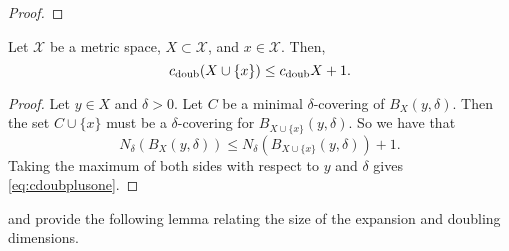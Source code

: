 \documentclass[../main.tex]{subfiles}
\newcommand{\set}[1]{\mathcal {#1}}
\newcommand{\cdoub}{c_\textnormal{doub}}
\begin{document}
\begin{proof}
%
\end{proof}

\begin{lemma}
    Let $\set X$ be a metric space, $X\subset\set X$, and $x\in\set X$.
    Then,
    \begin{equation}
        \label{eq:cdoubplusone}
        \cdoub (X\cup\{x\}) \le \cdoub X + 1.
    \end{equation}
\end{lemma}
\begin{proof}
    Let $y\in X$ and $\delta>0$.
    Let $C$ be a minimal $\delta$-covering of $B_X(y,\delta)$.
    Then the set $C\cup\{x\}$ must be a $\delta$-covering for $B_{X\cup\{x\}}(y,\delta)$.
    So we have that 
    \begin{equation}
        N_\delta(B_X(y,\delta)) \le N_\delta(B_{X\cup\{x\}}(y,\delta))+1
        .
    \end{equation}
    Taking the maximum of both sides with respect to $y$ and $\delta$ gives \eqref{eq:cdoubplusone}.
\end{proof}


\noindent
\citet{gupta2003bounded} and \cite{krauthgamer2004navigating} provide the following lemma relating the size of the expansion and doubling dimensions.
\end{document}
